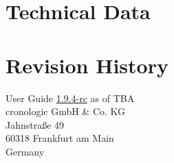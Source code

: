 \documentclass[12pt,notitlepage,a4paper]{report}
\newcommand{\ifxHPTDC}[2]{#1}
\newcommand{\ifxHPTDC}[2]{#2}
\newcommand{\ttinput}[1]{}
\newcommand{\ttinput}[1]{}
\newcommand{\ttinput}[1]{}
\newcommand{\ugrev}{{1.9.4-rc}}
\begin{document}
    \chapter{Technical Data}    
        \ttinput{Tech.tex} 
        

    \ifxHPTDC{}{
    \chapter{Ordering Information} \label{cp:ordering_information}
        
    }

    
    \chapter{Revision History} 
        \noindent
        User Guide \hyperlink{ugrev}{\ugrev} as of TBA\\  %
        cronologic GmbH \& Co. KG\\
        Jahnstraße 49\\
        60318 Frankfurt am Main\\Germany\\
        \ttinput{FwRev.tex}
        \ifxHPTDC{}{} 
        

    \ifxHPTDC{}{
    \phantomsection
    \addcontentsline{toc}{chapter}{Erratum}
    \chapter*{Erratum}
        
    }
\end{document}
